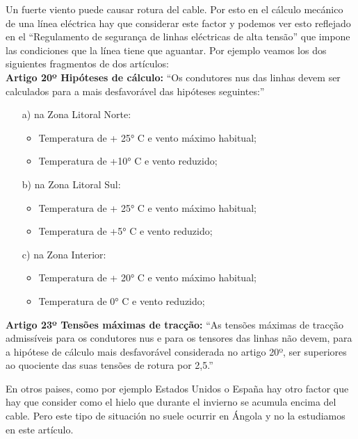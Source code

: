 Un fuerte viento puede causar rotura del cable. Por esto en el cálculo
mecánico de una línea eléctrica hay que considerar este factor y
podemos ver esto reflejado en el ``Regulamento de segurança de linhas
eléctricas de alta tensão'' que impone las condiciones que la línea
tiene que
aguantar. Por ejemplo veamos los dos siguientes fragmentos de dos artículos:\\
{\bf Artigo 20º Hipóteses de cálculo:} ``Os condutores nus das linhas
devem ser calculados para a mais desfavorável das hipóteses
seguintes:''
\begin{itemize}[noitemsep,nolistsep]
\item[a)] na Zona Litoral Norte:
  \begin{itemize}[noitemsep,nolistsep]
  \item Temperatura de + 25° C e vento máximo habitual;
  \item Temperatura de +10° C e vento reduzido; 
  \end{itemize}
\item[b)] na Zona Litoral Sul:
  \begin{itemize}[noitemsep,nolistsep]
  \item Temperatura de + 25° C e vento máximo habitual;
  \item Temperatura de +5° C e vento reduzido; 
  \end{itemize}
\item[c)] na Zona Interior:
  \begin{itemize}[noitemsep,nolistsep]
  \item Temperatura de + 20° C e vento máximo habitual;
  \item Temperatura de 0° C e vento reduzido; 
  \end{itemize}
\end{itemize}
{\bf Artigo 23º Tensões máximas de tracção:} ``As tensões máximas de
tracção admissíveis para os condutores nus e para os tensores das
linhas não devem, para a hipótese de cálculo mais desfavorável
considerada no artigo 20º, ser superiores ao quociente das suas
tensões de rotura por 2,5.''

En otros paises, como por ejemplo Estados Unidos o  España hay
otro factor que hay que consider como el hielo que durante el
invierno se acumula encima del cable. Pero este tipo de situación no
suele ocurrir en Ángola y no la estudiamos en este artículo.

